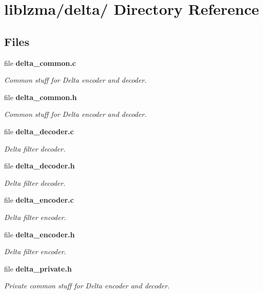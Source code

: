 \section{liblzma/delta/ Directory Reference}
\label{dir_bf76383f050c60e6d1da3961d5506f9e}
\subsection*{Files}
\begin{DoxyCompactItemize}
\item 
file {\bf delta\-\_\-common.\-c}
\begin{DoxyCompactList}\small\item\em Common stuff for Delta encoder and decoder. \end{DoxyCompactList}\item 
file {\bf delta\-\_\-common.\-h}
\begin{DoxyCompactList}\small\item\em Common stuff for Delta encoder and decoder. \end{DoxyCompactList}\item 
file {\bf delta\-\_\-decoder.\-c}
\begin{DoxyCompactList}\small\item\em Delta filter decoder. \end{DoxyCompactList}\item 
file {\bf delta\-\_\-decoder.\-h}
\begin{DoxyCompactList}\small\item\em Delta filter decoder. \end{DoxyCompactList}\item 
file {\bf delta\-\_\-encoder.\-c}
\begin{DoxyCompactList}\small\item\em Delta filter encoder. \end{DoxyCompactList}\item 
file {\bf delta\-\_\-encoder.\-h}
\begin{DoxyCompactList}\small\item\em Delta filter encoder. \end{DoxyCompactList}\item 
file {\bf delta\-\_\-private.\-h}
\begin{DoxyCompactList}\small\item\em Private common stuff for Delta encoder and decoder. \end{DoxyCompactList}\end{DoxyCompactItemize}

